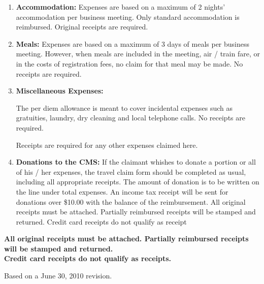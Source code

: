 \documentclass[10pt]{report}
\begin{document}
\begin{enumerate}
{\bf REQUIRED RECEIPTS:} For travel by air, rail or bus, the
customer's copy of the fare ticket is required as a receipt. For
electronic tickets the electronic ticket receipt is required. Please
obtain it from your travel agent or follow the on-line instructions
for printing the receipt. {\bf Boarding passes are also required as
  proof of travel.}

{\bf Full reimbursement:} As this copy is required for the return
trip, those requesting and expecting full reimbursement of their
travel fees should submit their claim upon completion of the trip.

\item {\bf Accommodation:} 
  Expenses are based on a maximum of 2 nights' accommodation per
  business meeting. Only standard accommodation is
  reimbursed. Original receipts are required.

\item {\bf Meals:} Expenses are based on a maximum of 3 days of meals
  per business meeting. However, when meals are included in the
  meeting, air / train fare, or in the costs of registration fees, no
  claim for that meal may be made. No receipts are required.

\item {\bf Miscellaneous Expenses:} 

  The per diem allowance is meant to cover incidental expenses such as
  gratuities, laundry, dry cleaning and local telephone calls. No
  receipts are required.

  Receipts are required for any other expenses claimed here.

\item {\bf Donations to the CMS:}
  If the claimant whishes to donate a portion or all of his / her
  expenses, the travel claim form should be completed as usual,
  including all appropriate receipts. The amount of donation is to be
  written on the line under total expenses. An income tax receipt will
  be sent for donations over \$10.00 with the balance of the
  reimbursement.  All original receipts must be attached. Partially
  reimbursed receipts will be stamped and returned.  Credit card
  receipts do not qualify as receipt

\end{enumerate}
\begin{center}
  {\bf All original receipts must be attached. Partially reimbursed
    receipts will be stamped and returned.  \\Credit card receipts do
    not qualify as receipts.}
\end{center}
{\footnotesize Based on a June 30, 2010 revision.}
\end{document}
